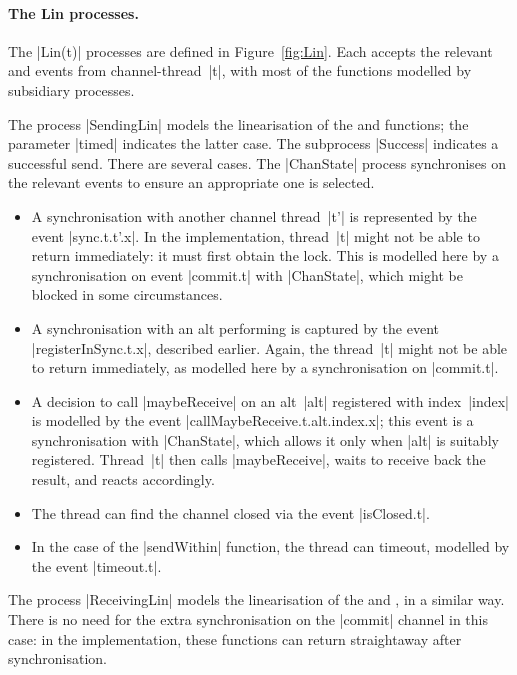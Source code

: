 
\paragraph{The {\cspmstyle Lin} processes.}

The |Lin(t)| processes are defined in Figure~\ref{fig:Lin}.  Each accepts the
relevant  and  events from channel-thread~|t|, with
most of the functions modelled by subsidiary processes.

The process |SendingLin| models the linearisation of the  and
 functions; the parameter |timed| indicates the latter case.
The subprocess |Success| indicates a successful send.  There are several
cases.  The |ChanState| process synchronises on the relevant events to ensure
an appropriate one is selected.
%
\begin{itemize}
\item A synchronisation with another channel thread~|t'| is represented by the
  event |sync.t.t'.x|.  In the implementation, thread~|t| might not be able to
  return immediately: it must first obtain the lock.  This is modelled here by
  a synchronisation on event |commit.t| with |ChanState|, which might be
  blocked in some circumstances.

\item A synchronisation with an alt performing  is captured
  by the event |registerInSync.t.x|, described earlier.  Again, the thread~|t|
  might not be able to return immediately, as modelled here by a
  synchronisation on |commit.t|.

\item A decision to call |maybeReceive| on an alt~|alt| registered with
  index~|index| is modelled by the event |callMaybeReceive.t.alt.index.x|;
  this event is a synchronisation with |ChanState|, which allows it only when
  |alt| is suitably registered.  Thread~|t| then calls |maybeReceive|, waits
  to receive back the result, and reacts accordingly.

\item The thread can find the channel closed via the event |isClosed.t|.

\item In the case of the |sendWithin| function, the thread can timeout,
  modelled by the event |timeout.t|.  
\end{itemize}

The process |ReceivingLin| models the linearisation of the  and
, in a similar way.  There is no need for the extra
synchronisation on the |commit| channel in this case: in the implementation,
these functions can return straightaway after synchronisation. 

